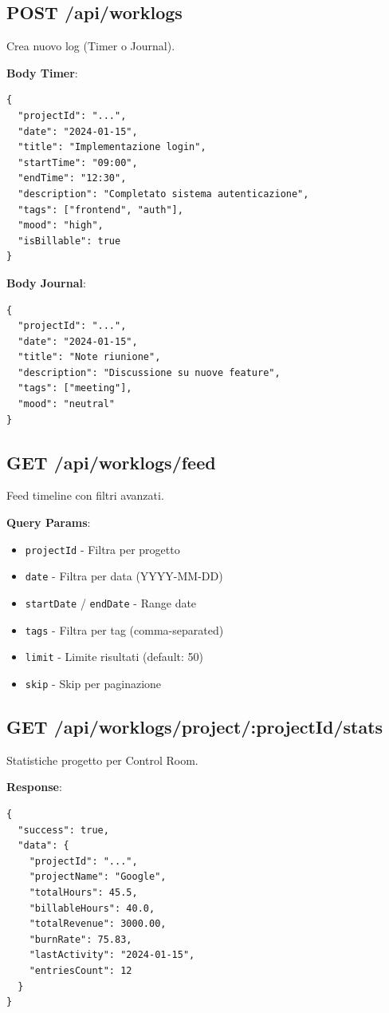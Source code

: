 \documentclass[11pt,a4paper]{article}
\begin{document}
\subsection{POST /api/worklogs}

Crea nuovo log (Timer o Journal).

\textbf{Body Timer}:
\begin{lstlisting}
{
  "projectId": "...",
  "date": "2024-01-15",
  "title": "Implementazione login",
  "startTime": "09:00",
  "endTime": "12:30",
  "description": "Completato sistema autenticazione",
  "tags": ["frontend", "auth"],
  "mood": "high",
  "isBillable": true
}
\end{lstlisting}

\textbf{Body Journal}:
\begin{lstlisting}
{
  "projectId": "...",
  "date": "2024-01-15",
  "title": "Note riunione",
  "description": "Discussione su nuove feature",
  "tags": ["meeting"],
  "mood": "neutral"
}
\end{lstlisting}

\subsection{GET /api/worklogs/feed}

Feed timeline con filtri avanzati.

\textbf{Query Params}:
\begin{itemize}
    \item \texttt{projectId} - Filtra per progetto
    \item \texttt{date} - Filtra per data (YYYY-MM-DD)
    \item \texttt{startDate} / \texttt{endDate} - Range date
    \item \texttt{tags} - Filtra per tag (comma-separated)
    \item \texttt{limit} - Limite risultati (default: 50)
    \item \texttt{skip} - Skip per paginazione
\end{itemize}

\subsection{GET /api/worklogs/project/:projectId/stats}

Statistiche progetto per Control Room.

\textbf{Response}:
\begin{lstlisting}
{
  "success": true,
  "data": {
    "projectId": "...",
    "projectName": "Google",
    "totalHours": 45.5,
    "billableHours": 40.0,
    "totalRevenue": 3000.00,
    "burnRate": 75.83,
    "lastActivity": "2024-01-15",
    "entriesCount": 12
  }
}
\end{lstlisting}
\end{document}
